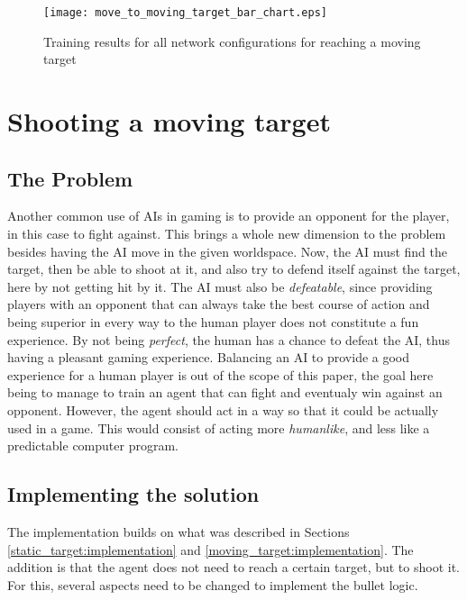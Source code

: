 \begin{figure}
    \begin{center}
        \texttt{[image: move\_to\_moving\_target\_bar\_chart.eps]}
        \caption{Training results for all network configurations for reaching a moving target}
        \label{train_results_moving_bar_chart}
    \end{center}
\end{figure}






\section{Shooting a moving target}

\subsection{The Problem}

Another common use of AIs in gaming is to provide an opponent for the player, in this case to fight against. This brings a whole new dimension to the problem besides having the AI move in the given worldspace. Now, the AI must find the target, then be able to shoot at it, and also try to defend itself against the target, here by not getting hit by it. The AI must also be \emph{defeatable}, since providing players with an opponent that can always take the best course of action and being superior in every way to the human player does not constitute a fun experience. By not being \emph{perfect}, the human has a chance to defeat the AI, thus having a pleasant gaming experience. Balancing an AI to provide a good experience for a human player is out of the scope of this paper, the goal here being to manage to train an agent that can fight and eventualy win against an opponent. However, the agent should act in a way so that it could be actually used in a game. This would consist of acting more \emph{humanlike}, and less like a predictable computer program.

\subsection{Implementing the solution}

The implementation builds on what was described in Sections \ref{static_target:implementation} and \ref{moving_target:implementation}. The addition is that the agent does not need to reach a certain target, but to shoot it. For this, several aspects need to be changed to implement the bullet logic.

